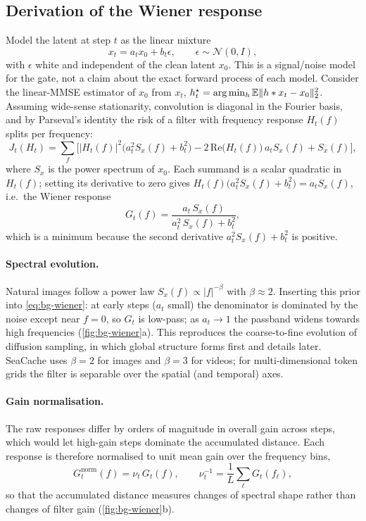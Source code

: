 \subsection{Derivation of the Wiener response}
Model the latent at step $t$ as the linear mixture
\begin{equation}
  x_t = a_t x_0 + b_t \epsilon, \qquad \epsilon\sim\mathcal N(0,I),
\end{equation}
with $\epsilon$ white and independent of the clean latent $x_0$. This is a signal/noise model for the gate, not a claim about the exact forward process of each model. Consider the linear-MMSE estimator of $x_0$ from $x_t$, $h_t^\star = \arg\min_h \mathbb{E}\|h * x_t - x_0\|_2^2$. Assuming wide-sense stationarity, convolution is diagonal in the Fourier basis, and by Parseval's identity the risk of a filter with frequency response $H_t(f)$ splits per frequency:
\begin{equation}
  J_t(H_t) = \sum_f \Big[ |H_t(f)|^2\big(a_t^2S_x(f)+b_t^2\big) - 2\,\mathrm{Re}\big(H_t(f)\big)\,a_tS_x(f) + S_x(f)\Big],
\end{equation}
where $S_x$ is the power spectrum of $x_0$. Each summand is a scalar quadratic in $H_t(f)$; setting its derivative to zero gives $H_t(f)\big(a_t^2S_x(f)+b_t^2\big) = a_tS_x(f)$, i.e.\ the Wiener response \citep{wiener1949extrapolation}
\begin{equation}\label{eq:bg-wiener}
  G_t(f) = \frac{a_t\, S_x(f)}{a_t^2\, S_x(f) + b_t^2},
\end{equation}
which is a minimum because the second derivative $a_t^2S_x(f)+b_t^2$ is positive.

\paragraph{Spectral evolution.} Natural images follow a power law $S_x(f)\propto |f|^{-\beta}$ with $\beta\approx 2$. Inserting this prior into \cref{eq:bg-wiener}: at early steps ($a_t$ small) the denominator is dominated by the noise except near $f=0$, so $G_t$ is low-pass; as $a_t\to 1$ the passband widens towards high frequencies (\cref{fig:bg-wiener}a). This reproduces the coarse-to-fine evolution of diffusion sampling, in which global structure forms first and details later. SeaCache uses $\beta=2$ for images and $\beta=3$ for videos; for multi-dimensional token grids the filter is separable over the spatial (and temporal) axes.

\paragraph{Gain normalisation.} The raw responses differ by orders of magnitude in overall gain across steps, which would let high-gain steps dominate the accumulated distance. Each response is therefore normalised to unit mean gain over the frequency bins,
\begin{equation}\label{eq:bg-norm}
  G^{\mathrm{norm}}_t(f) = \nu_t\, G_t(f), \qquad \nu_t^{-1} = \frac{1}{L}\sum_{\ell} G_t(f_\ell),
\end{equation}
so that the accumulated distance measures changes of spectral shape rather than changes of filter gain (\cref{fig:bg-wiener}b).

